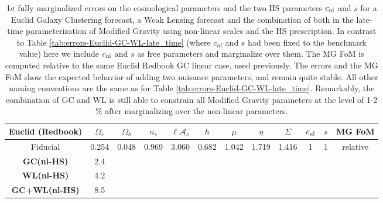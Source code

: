 \begin{table}[htbp]
\centering{}%
\footnotesize
\begin{tabular}{|c|c|c|c|c|c||c|c|c||c|c|c|}
\hline 
\textbf{Euclid} (Redbook)  & $\Omega_{c}$  & $\Omega_{b}$  & $n_{s}$  &
$\ell\mathcal{A}_{s}$  & $h$  & $\mu$  & $\eta$  & $\Sigma$ \Tstrut &
$c_{\mathrm{nl}}$  & $s$ & MG FoM \tabularnewline
\hline 
\Tstrut Fiducial  & {0.254}  & {0.048}  & {0.969}  & {3.060}  & {0.682}  & {1.042}  & {1.719}  & {1.416}  & {1}  & {1} & relative \tabularnewline
\hline
\hline
\Tstrut \textbf{GC(nl-HS)}   
& 2.4 \tabularnewline 
\Tstrut \textbf{WL(nl-HS)}    
& 4.2 \tabularnewline 
\Tstrut \textbf{GC+WL(nl-HS)}   
& 8.5 \tabularnewline
\hline 
\end{tabular}
\small
\protect\caption[1$\sigma$ forecasted errors on the cosmological parameters for a Euclid GC and WL survey, marginalizing over
the HS non-linear prescription parameters.]{\label{tab:errors-GC+WL-Marginalize-HS-Zhao-Euclid-DEpar-muetasigma}
1$\sigma$ fully marginalized errors on the cosmological parameters
and the two HS parameters $c_{\mathrm{nl}}$ and $s$ for a Euclid Galaxy
Clustering forecast, a Weak Lensing forecast and the combination of
both in the late-time parameterization of Modified Gravity using non-linear
scales and the HS prescription. In contrast to Table
\ref{tab:errors-Euclid-GC-WL-late_time} (where $c_{nl}$ and $s$ had been fixed to the benchmark value)
here we include $c_{\mathrm{nl}}$ and $s$ as free parameters
and marginalize over them. The MG FoM is computed relative to the same Euclid Redbook GC 
linear case,
used previously. The errors and the MG FoM show the expected behavior
of adding two nuisance parameters, and remain quite stable. All other naming conventions are the
same as for Table \ref{tab:errors-Euclid-GC-WL-late_time}. Remarkably, the combination of GC and WL is still able to constrain all Modified Gravity parameters at the level of 1-2 $\%$ after marginalizing over the non-linear parameters.}
\end{table}
\normalsize



